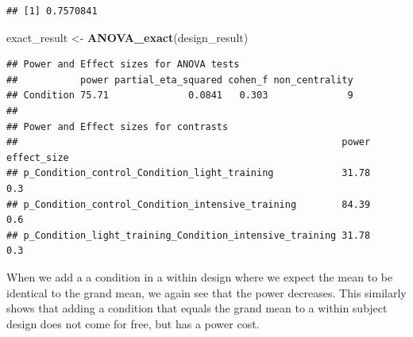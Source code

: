 \documentclass[]{book}
\newenvironment{Shaded}{\begin{snugshade}}{\end{snugshade}}
\newcommand{\CommentTok}[1]{\textcolor[rgb]{0.56,0.35,0.01}{\textit{#1}}}
\newcommand{\DataTypeTok}[1]{\textcolor[rgb]{0.13,0.29,0.53}{#1}}
\newcommand{\DecValTok}[1]{\textcolor[rgb]{0.00,0.00,0.81}{#1}}
\newcommand{\FloatTok}[1]{\textcolor[rgb]{0.00,0.00,0.81}{#1}}
\newcommand{\KeywordTok}[1]{\textcolor[rgb]{0.13,0.29,0.53}{\textbf{#1}}}
\newcommand{\NormalTok}[1]{#1}
\newcommand{\OperatorTok}[1]{\textcolor[rgb]{0.81,0.36,0.00}{\textbf{#1}}}
\newcommand{\StringTok}[1]{\textcolor[rgb]{0.31,0.60,0.02}{#1}}
\begin{document}
\begin{verbatim}
## [1] 0.7570841
\end{verbatim}

\begin{Shaded}
\begin{Highlighting}[]
\NormalTok{exact_result <-}\StringTok{ }\KeywordTok{ANOVA_exact}\NormalTok{(design_result)}
\end{Highlighting}
\end{Shaded}

\begin{verbatim}
## Power and Effect sizes for ANOVA tests
##           power partial_eta_squared cohen_f non_centrality
## Condition 75.71              0.0841   0.303              9
## 
## Power and Effect sizes for contrasts
##                                                         power effect_size
## p_Condition_control_Condition_light_training            31.78         0.3
## p_Condition_control_Condition_intensive_training        84.39         0.6
## p_Condition_light_training_Condition_intensive_training 31.78         0.3
\end{verbatim}

When we add a a condition in a within design where we expect the mean to be identical to the grand mean, we again see that the power decreases. This similarly shows that adding a condition that equals the grand mean to a within subject design does not come for free, but has a power cost.

\begin{Shaded}
\end{Shaded}
\end{document}
